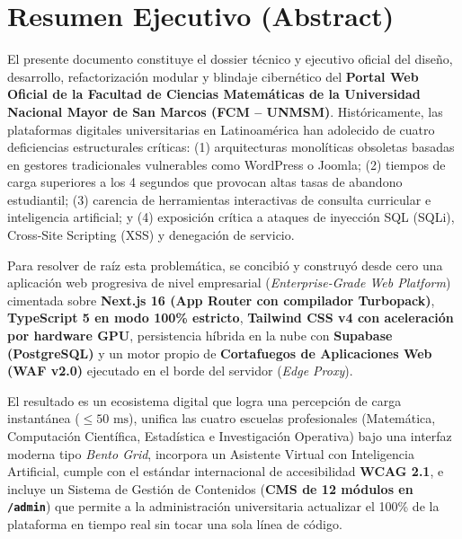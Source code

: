 \documentclass[12pt,a4paper,oneside]{report}
\begin{document}
\chapter*{Resumen Ejecutivo (Abstract)}

\noindent
El presente documento constituye el dossier técnico y ejecutivo oficial del diseño, desarrollo, refactorización modular y blindaje cibernético del \textbf{Portal Web Oficial de la Facultad de Ciencias Matemáticas de la Universidad Nacional Mayor de San Marcos (FCM -- UNMSM)}. Históricamente, las plataformas digitales universitarias en Latinoamérica han adolecido de cuatro deficiencias estructurales críticas: (1) arquitecturas monolíticas obsoletas basadas en gestores tradicionales vulnerables como WordPress o Joomla; (2) tiempos de carga superiores a los 4 segundos que provocan altas tasas de abandono estudiantil; (3) carencia de herramientas interactivas de consulta curricular e inteligencia artificial; y (4) exposición crítica a ataques de inyección SQL (SQLi), Cross-Site Scripting (XSS) y denegación de servicio.

Para resolver de raíz esta problemática, se concibió y construyó desde cero una aplicación web progresiva de nivel empresarial (\textit{Enterprise-Grade Web Platform}) cimentada sobre \textbf{Next.js 16 (App Router con compilador Turbopack)}, \textbf{TypeScript 5 en modo 100\% estricto}, \textbf{Tailwind CSS v4 con aceleración por hardware GPU}, persistencia híbrida en la nube con \textbf{Supabase (PostgreSQL)} y un motor propio de \textbf{Cortafuegos de Aplicaciones Web (WAF v2.0)} ejecutado en el borde del servidor (\textit{Edge Proxy}).

El resultado es un ecosistema digital que logra una percepción de carga instantánea ($\le 50\text{ ms}$), unifica las cuatro escuelas profesionales (Matemática, Computación Científica, Estadística e Investigación Operativa) bajo una interfaz moderna tipo \textit{Bento Grid}, incorpora un Asistente Virtual con Inteligencia Artificial, cumple con el estándar internacional de accesibilidad \textbf{WCAG 2.1}, e incluye un Sistema de Gestión de Contenidos (\textbf{CMS de 12 módulos en \texttt{/admin}}) que permite a la administración universitaria actualizar el 100\% de la plataforma en tiempo real sin tocar una sola línea de código.
\end{document}
